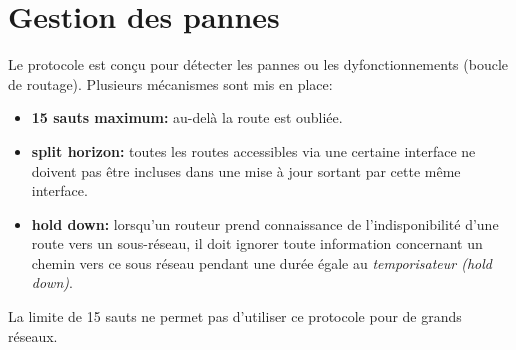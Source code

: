\documentclass[a4paper,11pt]{article}
\begin{document}
\section{Gestion des pannes}
Le protocole est conçu pour détecter les pannes ou les dyfonctionnements (boucle de routage). Plusieurs mécanismes sont mis en place:
\begin{itemize}
    \item \textbf{15 sauts maximum:} au-delà la route est oubliée.
    \item \textbf{split horizon:} toutes les routes accessibles via une certaine interface ne doivent pas être incluses dans une mise à jour sortant par cette même interface.
    \item \textbf{hold down:} lorsqu'un routeur prend connaissance de l'indisponibilité d'une route vers un sous-réseau, il doit ignorer toute information concernant un chemin vers ce sous réseau pendant une durée égale au \emph{temporisateur (hold down)}. 
\end{itemize}
\begin{aretenir}[Remarque]
La limite de 15 sauts ne permet pas d'utiliser ce protocole pour de grands réseaux.
\end{aretenir}
\end{document}
